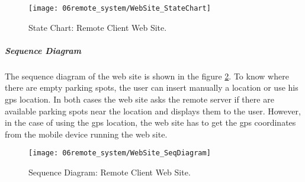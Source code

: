 \begin{figure}[H]
	\centering
	\texttt{[image: 06remote\_system/WebSite\_StateChart]}
	\caption{State Chart: Remote Client Web Site.}
	\label{fig:StateChart_WebSite}
\end{figure}

\clearpage

\subparagraph*{Sequence Diagram}
The sequence diagram of the web site is shown in the figure \ref{fig:SeqDiagram_WebSite}. To know where there are empty parking spots, the user can insert manually a location or use his \ac{gps} location. In both cases the web site asks the remote server if there are available parking spots near the location and displays them to the user. However, in the case of using the \ac{gps} location, the web site has to get the \ac{gps} coordinates from the mobile device running the web site.

\begin{figure}[H]
	\centering
	\texttt{[image: 06remote\_system/WebSite\_SeqDiagram]}
	\caption{Sequence Diagram: Remote Client Web Site.}
	\label{fig:SeqDiagram_WebSite}
\end{figure}